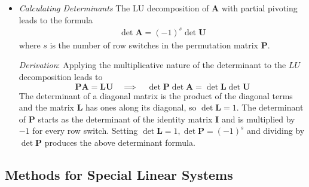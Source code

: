 \documentclass[11pt, a4paper]{article}
\newcommand{\mat}[1]{\mathbf{#1}} %
\begin{document}
\begin{itemize}
	\item \textit{Calculating Determinants} The LU decomposition of $ \mat{A} $ with partial pivoting leads to the formula
	\begin{align*}
		\det \mat{A} = (-1)^{s} \det \mat{U}
	\end{align*}
	where $ s $ is the number of row switches in the permutation matrix $ \mathbf{P} $.
	
	\textit{Derivation}: Applying the multiplicative nature of the determinant to the $ LU $ decomposition leads to
	\begin{equation*}
		\mathbf{P} \mat{A} = \mat{L} \mat{U} \quad \implies \quad \det \mathbf{P} \det \mat{A} = \det \mat{L} \det \mat{U}
	\end{equation*}
	The determinant of a diagonal matrix is the product of the diagonal terms and the matrix $ \mat{L} $ has ones along its diagonal, so $ \det \mat{L} = 1 $. The determinant of $ \mathbf{P} $ starts as the determinant of the identity matrix $ \mathbf{I} $ and is multiplied by $ -1 $ for every row switch. Setting $ \det \mat{L} = 1, \det \mathbf{P} = (-1)^s $ and dividing  by $ \det \mathbf{P} $ produces the above determinant formula.
\end{itemize}




\subsection{Methods for Special Linear Systems}
\end{document}
